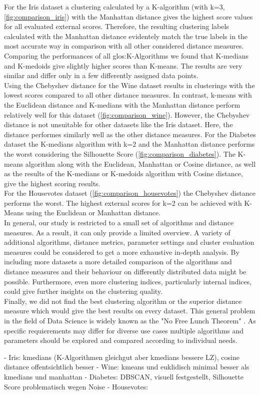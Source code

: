 For the Iris dataset a clustering calculated by a K-algorithm (with k=3, \autoref{fig:comparison_iris}) with the Manhattan distance gives the highest score values for all evaluated external scores. Therefore, the resulting clustering labels calculated with the Manhattan distance evidentely match the true labels in the most accurate way in comparison with all other considered distance measures. Comparing the performances of all \Gls{glos:K-Algorithms} we found that K-medians and K-medoids give slightly higher scores than K-means. The results are very similar and differ only in a few differently assigned data points. \\
Using the Chebyshev distance for the Wine dataset results in clusterings with the lowest scores compared to all other distance measures. In contrast, k-means with the Euclidean distance and K-medians with the Manhattan distance perform relatively well for this dataset (\autoref{fig:comparison_wine}). However, the Chebyshev distance is not unsuitable for other datasets like the Iris dataset. Here, the distance performes similarly well as the other distance measures.
For the Diabetes dataset the K-medians algorithm with k=2 and the Manhattan distance performs the worst considering the Silhouette Score (\autoref{fig:comparison_diabetes}). The K-means algorithm along with the Euclidean, Manhattan or Cosine distance, as well as the results of the K-medians or K-medoids algorithm with Cosine distance, give the highest scoring results. \\
For the Housevotes dataset (\autoref{fig:comparison_housevotes}) the Chebyshev distance performs the worst. The highest external scores for k=2 can be achieved with K-Means using the Euclidean or Manhattan distance. \\


In general, our study is restricted to a small set of algorithms and distance measures. As a result, it can only provide a limited overview. A variety of additional algorithms, distance metrics, parameter settings and cluster evaluation measures could be considered to get a more exhaustive in-depth analysis. By including more datasets a more detailed comparison of the algorithms and distance measures and their behaviour on differently distributed data might be possible. Furthermore, even more clustering indices, particularly internal indices, could give further insights on the clustering quality. \\

Finally, we did not find the best clustering algorithm or the superior distance measure which would give the best results on every dataset. This general problem in the field of Data Science is widely known as the "No Free Lunch Theorem" \cite{nofreelunch}. As specific requierements may differ for diverse use cases multiple algorithms and parameters should be explored and compared according to individual needs. 

- Iris: kmedians (K-Algorithmen gleichgut aber kmedians bessere LZ), cosine distance offentsichtlich besser
- Wine: kmeans und euklidisch minimal besser als kmedians und manhattan
- Diabetes: DBSCAN, visuell festgestellt, Silhouette Score problematisch wegen Noise  
- Housevotes: 